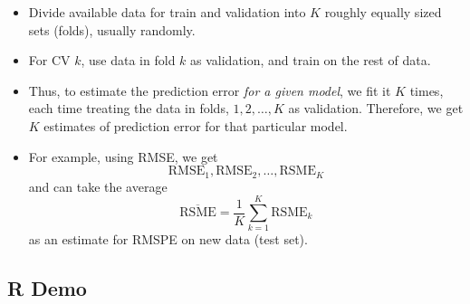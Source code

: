 \begin{itemize}
\begin{figure}[!ht]
          \end{figure}
          \begin{itemize}
              \item Divide available data for train and validation
                    into $ K $ roughly equally sized sets (folds),
                    usually randomly.
              \item For CV $ k $, use data in fold $ k $
                    as validation, and train on
                    the rest of data.
              \item Thus, to estimate the prediction error
                    \emph{for a given model}, we fit it $ K $ times, each
                    time treating the data in folds, $ 1,2,\ldots,K $
                    as validation.
                    Therefore, we get $ K $ estimates of prediction error
                    for that particular model.
              \item For example, using RMSE, we get
                    \[ \text{RMSE}_1,\text{RMSE}_2,\ldots,\text{RSME}_K \]
                    and can take the average
                    \[ \overline{\text{RSME}}=\frac{1}{K} \sum_{k=1}^{K}\text{RSME}_k \]
                    as an estimate for RMSPE on new data (test set).
          \end{itemize}
\end{itemize}
\subsection{R Demo}

